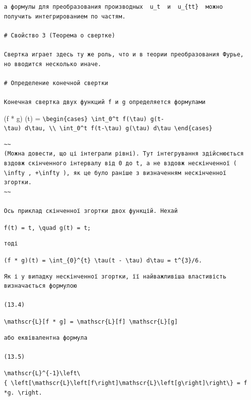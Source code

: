 \documentclass[
  ukrainian,
]{article}
\begin{document}
\begin{verbatim}
а формулы для преобразования производных  u_t  и  u_{tt}  можно получить интегрированием по частям.

# Свойство 3 (Теорема о свертке)

Свертка играет здесь ту же роль, что и в теории преобразования Фурье, но вводится несколько иначе.

# Определение конечной свертки

Конечная свертка двух функций f и g определяется формулами
\end{verbatim}

(f * g) (t) =
\texttt{\textbackslash{}begin\{cases\}\ \textbackslash{}int\_0\^{}t\ f(\textbackslash{}tau)\ g(t-\textbackslash{}tau)\ d\textbackslash{}tau,\ \textbackslash{}\textbackslash{}\ \textbackslash{}int\_0\^{}t\ f(t-\textbackslash{}tau)\ g(\textbackslash{}tau)\ d\textbackslash{}tau\ \textbackslash{}end\{cases\}}

\begin{verbatim}
~~
(Можна довести, що ці інтеграли рівні). Тут інтегрування здійснюється вздовж скінченного інтервалу від 0 до t, а не вздовж нескінченної ( \infty , +\infty ), як це було раніше з визначенням нескінченної згортки.
~~

Ось приклад скінченної згортки двох функцій. Нехай
\end{verbatim}

\texttt{f(t)\ =\ t,\ \textbackslash{}quad\ g(t)\ =\ t;}

\begin{verbatim}
тоді
\end{verbatim}

\texttt{(f\ *\ g)(t)\ =\ \textbackslash{}int\_\{0\}\^{}\{t\}\ \textbackslash{}tau(t\ -\ \textbackslash{}tau)\ d\textbackslash{}tau\ =\ t\^{}\{3\}/6.}

\begin{verbatim}
Як і у випадку нескінченної згортки, її найважливіша властивість визначається формулою

(13.4)
\end{verbatim}

\texttt{\textbackslash{}mathscr\{L\}{[}f\ *\ g{]}\ =\ \textbackslash{}mathscr\{L\}{[}f{]}\ \textbackslash{}mathscr\{L\}{[}g{]}}

\begin{verbatim}
або еквівалентна формула

(13.5)
\end{verbatim}

\texttt{\textbackslash{}mathscr\{L\}\^{}\{-1\}\textbackslash{}left\textbackslash{}\{\ \textbackslash{}left{[}\textbackslash{}mathscr\{L\}\textbackslash{}left{[}f\textbackslash{}right{]}\textbackslash{}mathscr\{L\}\textbackslash{}left{[}g\textbackslash{}right{]}\textbackslash{}right\textbackslash{}\}\ =\ f*g.\ \textbackslash{}right.}
\end{document}
